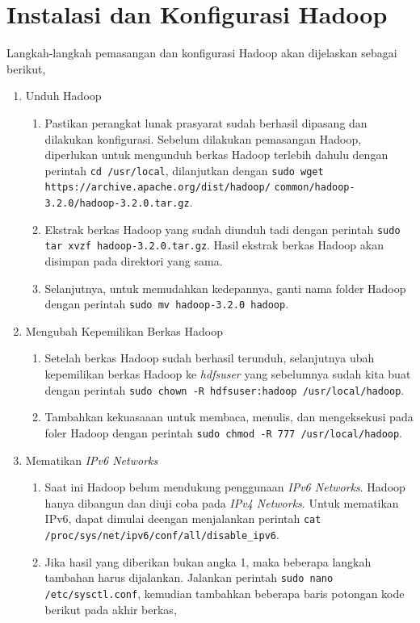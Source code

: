 \chapter{Instalasi dan Konfigurasi Hadoop}
\label{appendix:C}

Langkah-langkah pemasangan dan konfigurasi Hadoop akan dijelaskan sebagai berikut,

\begin{enumerate}
  \item Unduh Hadoop
  \begin{enumerate}
    \item Pastikan perangkat lunak prasyarat sudah berhasil dipasang dan dilakukan konfigurasi. Sebelum dilakukan pemasangan Hadoop, diperlukan untuk mengunduh berkas Hadoop terlebih dahulu dengan perintah \verb|cd /usr/local|, dilanjutkan dengan \verb|sudo wget https://archive.apache.org/dist/hadoop/|
    \newline \verb|common/hadoop-3.2.0/hadoop-3.2.0.tar.gz|.
    \item Ekstrak berkas Hadoop yang sudah diunduh tadi dengan perintah \verb|sudo tar xvzf hadoop-3.2.0.tar.gz|. Hasil ekstrak berkas Hadoop akan disimpan pada direktori yang sama.
    \item Selanjutnya, untuk memudahkan kedepannya, ganti nama folder Hadoop dengan perintah \verb|sudo mv hadoop-3.2.0 hadoop|.
  \end{enumerate}
  \item Mengubah Kepemilikan Berkas Hadoop
  \begin{enumerate}
    \item Setelah berkas Hadoop sudah berhasil terunduh, selanjutnya ubah kepemilikan berkas Hadoop ke \textit{hdfsuser} yang sebelumnya sudah kita buat dengan perintah \verb|sudo chown -R hdfsuser:hadoop /usr/local/hadoop|.
    \item Tambahkan kekuasaaan untuk membaca, menulis, dan mengeksekusi pada foler Hadoop dengan perintah \verb|sudo chmod -R 777 /usr/local/hadoop|.
  \end{enumerate}
  \item Mematikan \textit{IPv6 Networks}
  \begin{enumerate}
    \item Saat ini Hadoop belum mendukung penggunaan \textit{IPv6 Networks}. Hadoop hanya dibangun dan diuji coba pada \textit{IPv4 Networks}. Untuk mematikan IPv6, dapat dimulai deengan menjalankan perintah \verb|cat /proc/sys/net/ipv6/conf/all/disable_ipv6|.
    \item Jika hasil yang diberikan bukan angka 1, maka beberapa langkah tambahan harus dijalankan. Jalankan perintah \verb|sudo nano /etc/sysctl.conf|, kemudian tambahkan beberapa baris potongan kode berikut pada akhir berkas,

\end{enumerate}
\end{enumerate}
